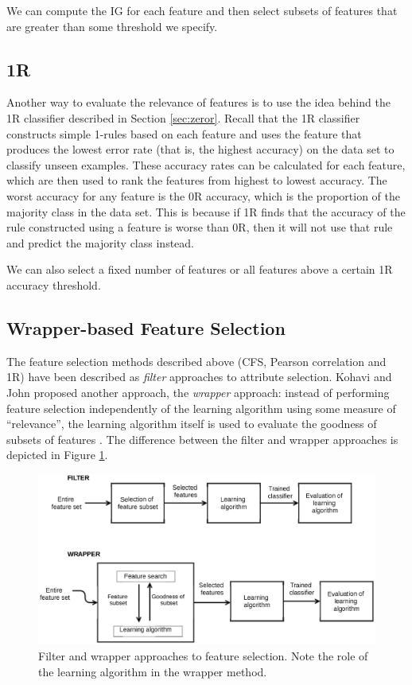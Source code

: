 We can compute the IG for each feature and then select subsets of features that
are greater than some threshold we specify.

\subsection{1R}
Another way to evaluate the relevance of features is to use the idea behind the
1R classifier described in Section \ref{sec:zeror}. Recall that the 1R
classifier constructs simple 1-rules based on each feature and uses the feature
that produces the lowest error rate (that is, the highest accuracy) on the data
set to classify unseen examples. These accuracy rates can be calculated for
each feature, which are then used to rank the features from highest to lowest
accuracy. The worst accuracy for any feature is the 0R accuracy, which is the
proportion of the majority class in the data set. This is because if 1R finds
that the accuracy of the rule constructed using a feature is worse than 0R,
then it will not use that rule and predict the majority class instead.

We can also select a fixed number of features or all features above a certain
1R accuracy threshold.

\subsection{Wrapper-based Feature Selection}
The feature selection methods described above (CFS, Pearson correlation and
1R) have been described as \textit{filter} approaches to attribute selection.
Kohavi and John proposed another approach, the \textit{wrapper} approach:
instead of performing feature selection independently of the learning
algorithm using some measure of ``relevance'',
the learning algorithm itself is used to evaluate the goodness of
subsets of features \cite{Kohavi1997}. The difference between the filter
and wrapper approaches is depicted in Figure \ref{fig:wrapper}.

\begin{figure}[h]
\centering
\includegraphics[scale=0.9]{images/method/feature-selection.eps}
\caption{Filter and wrapper approaches to feature selection. Note the role of
the learning algorithm in the wrapper method.}
\label{fig:wrapper}
\end{figure}

